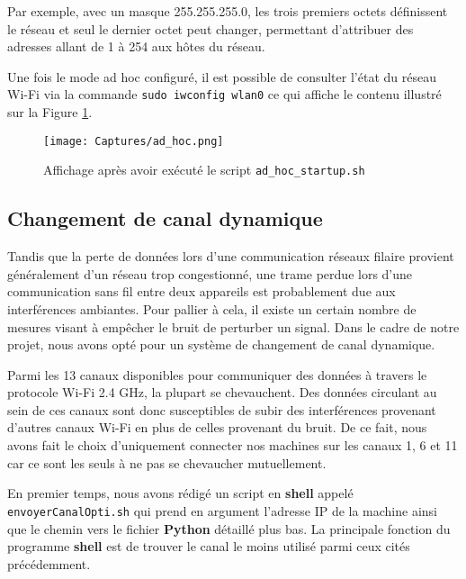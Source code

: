 \documentclass[a4paper,11pt]{article}
\begin{document}
Par exemple, avec un masque 255.255.255.0, les trois premiers octets définissent le réseau et seul le dernier octet peut changer, permettant d’attribuer des adresses allant de 1 à 254 aux hôtes du réseau. 

\quad

Une fois le mode ad hoc configuré, il est possible de consulter l'état du réseau Wi-Fi via la commande \texttt{sudo iwconfig wlan0} ce qui affiche le contenu illustré sur la Figure \ref{fig:ad-hoc}.

\begin{figure}[ht]
    \centering
    \texttt{[image: Captures/ad\_hoc.png]}
    \caption{Affichage après avoir exécuté le script \texttt{ad\_hoc\_startup.sh}}
    \label{fig:ad-hoc}
\end{figure}

\FloatBarrier


\subsection{Changement de canal dynamique}

Tandis que la perte de données lors d'une communication réseaux filaire provient généralement d'un réseau trop congestionné, une trame perdue lors d'une communication sans fil entre deux appareils est probablement due aux interférences ambiantes. Pour pallier à cela, il existe un certain nombre de mesures visant à empêcher le bruit de perturber un signal. Dans le cadre de notre projet, nous avons opté pour un système de changement de canal dynamique.

\quad

Parmi les 13 canaux disponibles pour communiquer des données à travers le protocole Wi-Fi 2.4 GHz, la plupart se chevauchent. Des données circulant au sein de ces canaux sont donc susceptibles de subir des interférences provenant d'autres canaux Wi-Fi en plus de celles provenant du bruit. De ce fait, nous avons fait le choix d'uniquement connecter nos machines sur les canaux 1, 6 et 11 car ce sont les seuls à ne pas se chevaucher mutuellement.

\quad

En premier temps, nous avons rédigé un script en \textbf{shell} appelé \texttt{envoyerCanalOpti.sh} qui prend en argument l'adresse IP de la machine ainsi que le chemin vers le fichier \textbf{Python} détaillé plus bas. La principale fonction du programme \textbf{shell} est de trouver le canal le moins utilisé parmi ceux cités précédemment. 
\end{document}
